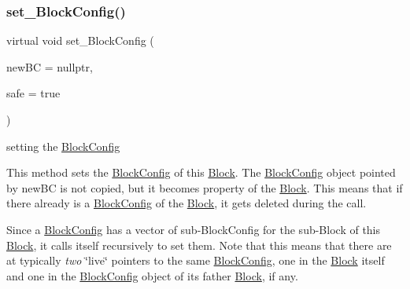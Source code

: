 \subsubsection{\texorpdfstring{set\+\_\+\+Block\+Config()}{set\_BlockConfig()}}
{\footnotesize\ttfamily virtual void set\+\_\+\+Block\+Config (\begin{DoxyParamCaption}\item[{\mbox{\hyperlink{class_s_m_spp__di__unipi__it_1_1_block_config}{Block\+Config}} $\ast$}]{new\+BC = {\ttfamily nullptr},  }\item[{const bool}]{safe = {\ttfamily true} }\end{DoxyParamCaption})\hspace{0.3cm}{\ttfamily [virtual]}}



setting the \mbox{\hyperlink{class_s_m_spp__di__unipi__it_1_1_block_config}{Block\+Config}} 

This method sets the \mbox{\hyperlink{class_s_m_spp__di__unipi__it_1_1_block_config}{Block\+Config}} of this \mbox{\hyperlink{class_s_m_spp__di__unipi__it_1_1_block}{Block}}. The \mbox{\hyperlink{class_s_m_spp__di__unipi__it_1_1_block_config}{Block\+Config}} object pointed by new\+BC is not copied, but it becomes property of the \mbox{\hyperlink{class_s_m_spp__di__unipi__it_1_1_block}{Block}}. This means that if there already is a \mbox{\hyperlink{class_s_m_spp__di__unipi__it_1_1_block_config}{Block\+Config}} of the \mbox{\hyperlink{class_s_m_spp__di__unipi__it_1_1_block}{Block}}, it gets deleted during the call.

Since a \mbox{\hyperlink{class_s_m_spp__di__unipi__it_1_1_block_config}{Block\+Config}} has a vector of sub-\/\+Block\+Config for the sub-\/\+Block of this \mbox{\hyperlink{class_s_m_spp__di__unipi__it_1_1_block}{Block}}, it calls itself recursively to set them. Note that this means that there are at typically {\itshape two} \char`\"{}live\char`\"{} pointers to the same \mbox{\hyperlink{class_s_m_spp__di__unipi__it_1_1_block_config}{Block\+Config}}, one in the \mbox{\hyperlink{class_s_m_spp__di__unipi__it_1_1_block}{Block}} itself and one in the \mbox{\hyperlink{class_s_m_spp__di__unipi__it_1_1_block_config}{Block\+Config}} object of its father \mbox{\hyperlink{class_s_m_spp__di__unipi__it_1_1_block}{Block}}, if any.

